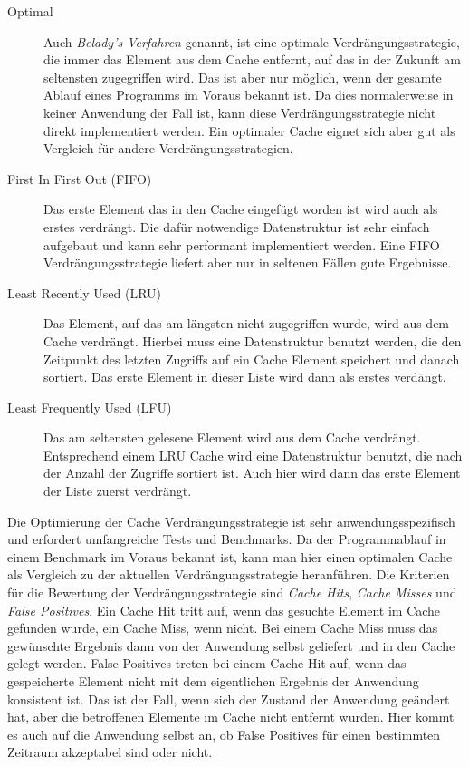 \begin{description}
	\item[Optimal] Auch \emph{Belady's Verfahren} genannt, ist eine optimale 
	Verdrängungsstrategie, die immer das Element aus dem Cache entfernt, auf das
	in der Zukunft am seltensten zugegriffen wird. Das ist aber nur möglich, wenn
	der gesamte Ablauf eines Programms im Voraus bekannt ist. Da dies
	normalerweise in keiner Anwendung der Fall ist, kann diese
	Verdrängungsstrategie nicht direkt implementiert werden. Ein optimaler Cache
	eignet sich aber gut als Vergleich für andere Verdrängungsstrategien.
	\item[First In First Out (FIFO)] Das erste Element das in den Cache eingefügt
	worden ist wird auch als erstes verdrängt. Die dafür notwendige Datenstruktur
	ist sehr einfach aufgebaut und kann sehr performant implementiert werden. Eine
	FIFO Verdrängungsstrategie liefert aber nur in seltenen Fällen gute
	Ergebnisse.
	\item[Least Recently Used (LRU)] Das Element, auf das am längsten nicht
	zugegriffen wurde, wird aus dem Cache verdrängt. Hierbei muss eine
	Datenstruktur benutzt werden, die den Zeitpunkt des letzten Zugriffs auf ein
	Cache Element speichert und danach sortiert. Das
	erste Element in dieser Liste wird dann als erstes verdängt.
	\item[Least Frequently Used (LFU)] Das am seltensten gelesene Element wird aus
	dem Cache verdrängt. Entsprechend einem LRU Cache wird eine Datenstruktur
	benutzt, die nach der Anzahl der Zugriffe sortiert ist. Auch hier wird dann das
	erste Element der Liste zuerst verdrängt.
\end{description}

Die Optimierung der Cache Verdrängungsstrategie ist sehr anwendungsspezifisch
und erfordert umfangreiche Tests und Benchmarks. Da der Programmablauf in einem
Benchmark im Voraus bekannt ist, kann man hier einen optimalen Cache als
Vergleich zu der aktuellen Verdrängungsstrategie heranführen. Die Kriterien für die
Bewertung der Verdrängungsstrategie sind \emph{Cache Hits}, \emph{Cache Misses}
und \emph{False Positives}. Ein Cache Hit tritt auf, wenn das gesuchte Element im
Cache gefunden wurde, ein Cache Miss, wenn nicht. Bei einem Cache Miss muss das
gewünschte Ergebnis dann von der Anwendung selbst geliefert und in den Cache
gelegt werden. False Positives treten bei einem Cache Hit auf, wenn das
gespeicherte Element nicht mit dem eigentlichen Ergebnis der Anwendung konsistent
ist. Das ist der Fall, wenn sich der Zustand der Anwendung geändert hat, aber die
betroffenen Elemente im Cache nicht entfernt wurden. Hier kommt es auch auf die
Anwendung selbst an, ob False Positives für einen bestimmten Zeitraum akzeptabel
sind oder nicht.

